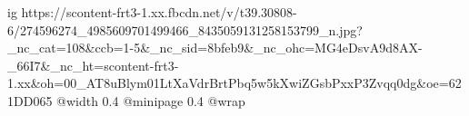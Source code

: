  
 
 
 
 

\ifcmt
  ig https://scontent-frt3-1.xx.fbcdn.net/v/t39.30808-6/274596274_4985609701499466_8435059131258153799_n.jpg?_nc_cat=108&ccb=1-5&_nc_sid=8bfeb9&_nc_ohc=MG4eDsvA9d8AX-_66I7&_nc_ht=scontent-frt3-1.xx&oh=00_AT8uBlym01LtXaVdrBrtPbq5w5kXwiZGsbPxxP3Zvqq0dg&oe=621DD065
  @width 0.4
  @minipage 0.4
  @wrap \parpic[r]
\fi

